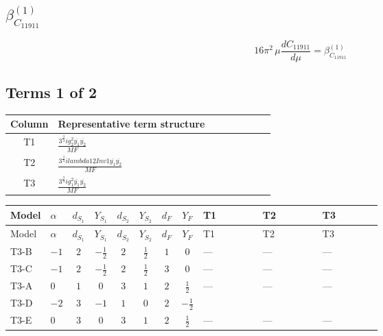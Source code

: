 \documentclass[8pt]{article}
\begin{document}
\begin{landscape}
\section*{$\beta_{C_{11911}}^{(1)}$}
\[16\pi^2\,\mu\frac{d C_{11911}}{d\mu}=\beta_{C_{11911}}^{(1)}\]
\subsection*{Terms 1 of 2}
\begin{center}
\begin{tabular}{@{}c >{\raggedright\arraybackslash}p{0.82\linewidth}@{}}
\toprule
Column & Representative term structure \\
\midrule
T1 & \(\displaystyle \frac{3^{\frac{3}{4}} i g_{2}^{2} \overline{y_{1}} \overline{y_{2}}}{MF}\) \\
\midrule
T2 & \(\displaystyle \frac{3^{\frac{3}{4}} i lambda12Inv1 \overline{y_{1}} \overline{y_{2}}}{MF}\) \\
\midrule
T3 & \(\displaystyle \frac{3^{\frac{3}{4}} i g_{1}^{2} \overline{y_{1}} \overline{y_{2}}}{MF}\) \\
\midrule
\bottomrule
\end{tabular}
\end{center}
\smallskip
\tiny
\begin{longtable}{@{}llcccccc >{\raggedright\arraybackslash}p{0.21\linewidth} >{\raggedright\arraybackslash}p{0.21\linewidth} >{\raggedright\arraybackslash}p{0.21\linewidth}@{}}
\toprule
Model & $\alpha$ & $d_{S_1}$ & $Y_{S_1}$ & $d_{S_2}$ & $Y_{S_2}$ & $d_F$ & $Y_F$ & T1 & T2 & T3 \\
\midrule
\endfirsthead
\toprule
Model & $\alpha$ & $d_{S_1}$ & $Y_{S_1}$ & $d_{S_2}$ & $Y_{S_2}$ & $d_F$ & $Y_F$ & T1 & T2 & T3 \\
\midrule
\endhead
T3-B & $-1$ & $2$ & $-\frac{1}{2}$ & $2$ & $\frac{1}{2}$ & $1$ & $0$ & --- & --- & --- \\
\midrule
T3-C & $-1$ & $2$ & $-\frac{1}{2}$ & $2$ & $\frac{1}{2}$ & $3$ & $0$ & --- & --- & --- \\
\midrule
T3-A & $0$ & $1$ & $0$ & $3$ & $1$ & $2$ & $\frac{1}{2}$ & --- & --- & --- \\
\midrule
T3-D & $-2$ & $3$ & $-1$ & $1$ & $0$ & $2$ & $-\frac{1}{2}$ & \scriptsize\adjustbox{max width=\linewidth}{$\begin{gathered} - \frac{11 \cdot 3^{\frac{3}{4}} i g_{2}^{2} \overline{y_{1}} \overline{y_{2}}}{8 MF}\end{gathered}$} & \scriptsize\adjustbox{max width=\linewidth}{$\begin{gathered} - \frac{3^{\frac{3}{4}} i lambda12Inv1 \overline{y_{1}} \overline{y_{2}}}{6 MF}\end{gathered}$} & \scriptsize\adjustbox{max width=\linewidth}{$\begin{gathered} - \frac{3^{\frac{3}{4}} i g_{1}^{2} \overline{y_{1}} \overline{y_{2}}}{8 MF}\end{gathered}$} \\
\midrule
T3-E & $0$ & $3$ & $0$ & $3$ & $1$ & $2$ & $\frac{1}{2}$ & --- & --- & --- \\
\midrule
\bottomrule
\end{longtable}
\clearpage

\end{landscape}
\end{document}
